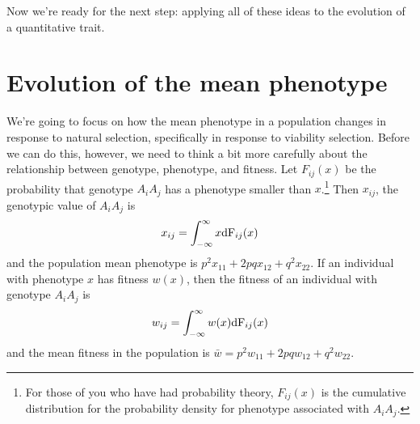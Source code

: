 Now we're ready for the next step: applying all of these ideas to the
evolution of a quantitative trait.

\section*{Evolution of the mean phenotype}

We're going to focus on how the mean phenotype in a population changes
in response to natural selection, specifically in response to
viability selection.  Before we can do this, however, we need to think
a bit more carefully about the relationship between genotype,
phenotype, and fitness.  Let $F_{ij}(x)$ be the probability that
genotype $A_iA_j$ has a phenotype smaller than $x$.\footnote{For those
  of you who have had probability theory, $F_{ij}(x)$ is the
  cumulative distribution for the probability density for phenotype
  associated with $A_iA_j$.} Then $x_{ij}$, the genotypic value of
$A_iA_j$ is
\[
x_{ij} = \int_{-\infty}^\infty x \mbox{\rm dF}_{ij}(x)
\]
and the population mean phenotype is $p^2x_{11} + 2pqx_{12} +
q^2x_{22}$.  If an individual with phenotype $x$ has fitness $w(x)$,
then the fitness of an individual with genotype $A_iA_j$
is
\[
w_{ij} = \int_{-\infty}^\infty w(x) \mbox{\rm dF}_{ij}(x)
\]
and the mean fitness in the population is $\bar w = p^2w_{11} +
2pqw_{12} + q^2w_{22}$.

